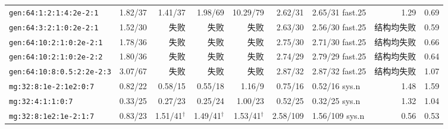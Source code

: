 {\begin{longtable}{lrrrrrlrr}
\texttt{gen:64:1:2:1:4:2e-2:1} & 1.82/37 & 1.41/37 & 1.98/69 & 10.29/79 & 2.62/31 & 2.65/31 fast.25 & 1.29 & 0.69 \\
\texttt{gen:64:3:2:1:0:2e-2:1} & 1.52/30 & 失败 & 失败 & 失败 & 2.63/30 & 2.56/30 fast.25 & 结构均失败 & 0.59 \\
\texttt{gen:64:10:2:1:0:2e-2:1} & 1.78/36 & 失败 & 失败 & 失败 & 2.75/30 & 2.71/30 fast.25 & 结构均失败 & 0.66 \\
\texttt{gen:64:10:2:1:0:2e-2:2} & 1.80/36 & 失败 & 失败 & 失败 & 2.74/29 & 2.79/29 fast.25 & 结构均失败 & 0.64 \\
\texttt{gen:64:10:8:0.5:2:2e-2:3} & 3.07/67 & 失败 & 失败 & 失败 & 2.87/32 & 2.87/32 fast.25 & 结构均失败 & 1.07 \\
\texttt{mg:32:8:1e-2:1e2:0:7} & 0.82/22 & 0.58/15 & 0.55/18 & 1.16/9 & 0.75/16 & 0.52/16 sys.n & 1.48 & 1.59 \\
\texttt{mg:32:4:1:1:0:7} & 0.33/25 & 0.27/23 & 0.25/24 & 1.00/23 & 0.52/25 & 0.32/25 sys.n & 1.32 & 1.04 \\
\texttt{mg:32:8:1e2:1e-2:1:7} & 0.83/23 & 1.51/41$^\dagger$ & 1.49/41$^\dagger$ & 1.53/41$^\dagger$ & 2.58/109 & 1.56/109 sys.n & 0.56 & 0.53 \\
\end{longtable}}

